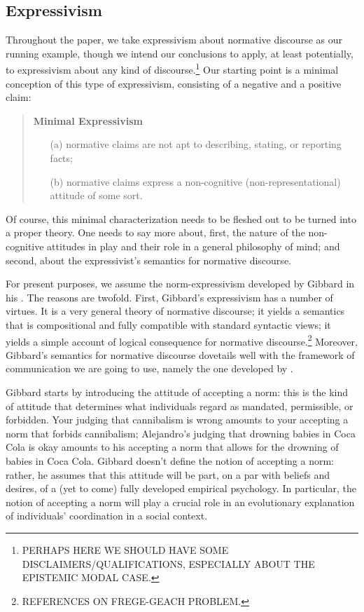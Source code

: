 \documentclass[11pt,article,oneside]{memoir}
\begin{document}
\subsection{Expressivism}
Throughout the paper, we take expressivism about normative discourse as our running example, though we intend our conclusions to apply, at least potentially, to expressivism about any kind of discourse.\footnote{PERHAPS HERE WE SHOULD HAVE SOME DISCLAIMERS/QUALIFICATIONS, ESPECIALLY ABOUT THE EPISTEMIC MODAL CASE.} Our starting point is a minimal conception of this type of expressivism, consisting of a negative and a positive claim: 
\begin{quote}
\textbf{Minimal Expressivism}
\begin{itemize}
\item[(a)] normative claims are not apt to describing, stating, or reporting facts; 
\item[(b)] normative claims express a non-cognitive (non-representational) attitude of some sort. 
\end{itemize}
\end{quote}
Of course, this minimal characterization needs to be fleshed out to be turned into a proper theory. One needs to say more about, first, the nature of the non-cognitive attitudes in play and their role in a general philosophy of mind; and second, about the expressivist's semantics for normative discourse. 

For present purposes, we assume the norm-expressivism developed by Gibbard in his \citeyearpar{gibbard1992}. The reasons are twofold. First, Gibbard's expressivism has a number of virtues. It is a very general theory of normative discourse; it yields a semantics that is compositional and fully compatible with standard syntactic views; it yields a simple account of logical consequence for normative discourse.\footnote{REFERENCES ON FREGE-GEACH PROBLEM.} Moreover, Gibbard's semantics for normative discourse dovetails well with the framework of communication we are going to use, namely the one developed by \citet{stalnaker1978}. 

Gibbard starts by introducing the attitude of accepting a norm: this is the kind of attitude that determines what individuals regard as mandated, permissible, or forbidden. Your judging that cannibalism is wrong amounts to your accepting a norm that forbids cannibalism; Alejandro's judging that drowning babies in Coca Cola is okay amounts to his accepting a norm that allows for the drowning of babies in Coca Cola. Gibbard doesn't define the notion of accepting a norm: rather, he assumes that this attitude will be part, on a par with beliefs and desires, of a (yet to come) fully developed empirical psychology. In particular, the notion of accepting a norm will play a crucial role in an evolutionary explanation of individuals' coordination in a social context.
\end{document}
